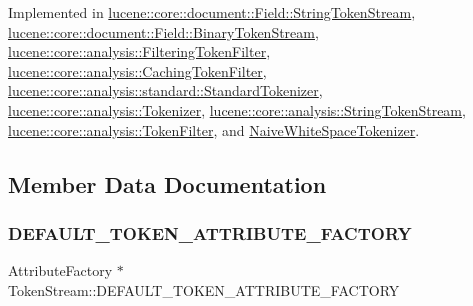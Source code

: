 Implemented in \mbox{\hyperlink{classlucene_1_1core_1_1document_1_1Field_1_1StringTokenStream_ac0073673de4b2eb307408d1aee40625c}{lucene\+::core\+::document\+::\+Field\+::\+String\+Token\+Stream}}, \mbox{\hyperlink{classlucene_1_1core_1_1document_1_1Field_1_1BinaryTokenStream_a99e2c5a8f41c6509ae7a43ade13c30bf}{lucene\+::core\+::document\+::\+Field\+::\+Binary\+Token\+Stream}}, \mbox{\hyperlink{classlucene_1_1core_1_1analysis_1_1FilteringTokenFilter_ab85e4deab22d9dedd7ccb7b1f4750400}{lucene\+::core\+::analysis\+::\+Filtering\+Token\+Filter}}, \mbox{\hyperlink{classlucene_1_1core_1_1analysis_1_1CachingTokenFilter_adde877fb8c464d6eb2766bd400a1499c}{lucene\+::core\+::analysis\+::\+Caching\+Token\+Filter}}, \mbox{\hyperlink{classlucene_1_1core_1_1analysis_1_1standard_1_1StandardTokenizer_a4d6e42ca0fcaf07cb6615643362891b3}{lucene\+::core\+::analysis\+::standard\+::\+Standard\+Tokenizer}}, \mbox{\hyperlink{classlucene_1_1core_1_1analysis_1_1Tokenizer_a459d9c95a28f3b8aa3ad1cfde1568dd3}{lucene\+::core\+::analysis\+::\+Tokenizer}}, \mbox{\hyperlink{classlucene_1_1core_1_1analysis_1_1StringTokenStream_ab578e75921eb1757b4a8887cf29fe94d}{lucene\+::core\+::analysis\+::\+String\+Token\+Stream}}, \mbox{\hyperlink{classlucene_1_1core_1_1analysis_1_1TokenFilter_a0671ee825db7735a7b72b7a27a457ed9}{lucene\+::core\+::analysis\+::\+Token\+Filter}}, and \mbox{\hyperlink{classNaiveWhiteSpaceTokenizer_aa532e6a3e2fa6a9ebb90a4324179a30f}{Naive\+White\+Space\+Tokenizer}}.



\subsection{Member Data Documentation}
\mbox{\label{classlucene_1_1core_1_1analysis_1_1TokenStream_a3a38785c7907943994326cb9d7180671}} 
\subsubsection{\texorpdfstring{D\+E\+F\+A\+U\+L\+T\+\_\+\+T\+O\+K\+E\+N\+\_\+\+A\+T\+T\+R\+I\+B\+U\+T\+E\+\_\+\+F\+A\+C\+T\+O\+RY}{DEFAULT\_TOKEN\_ATTRIBUTE\_FACTORY}}
{\footnotesize\ttfamily Attribute\+Factory $\ast$ Token\+Stream\+::\+D\+E\+F\+A\+U\+L\+T\+\_\+\+T\+O\+K\+E\+N\+\_\+\+A\+T\+T\+R\+I\+B\+U\+T\+E\+\_\+\+F\+A\+C\+T\+O\+RY\hspace{0.3cm}{\ttfamily [static]}}

